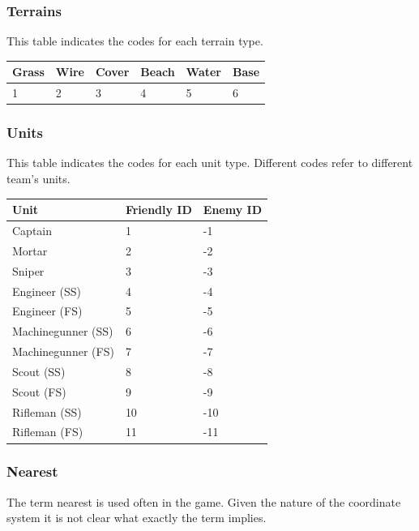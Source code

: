\documentclass{article}
\begin{document}
\subsubsection{Terrains}

This table indicates the codes for each terrain type.

\begin{minipage}{\textwidth}
\centering
\begin{tabular}{llllll}
    Grass & Wire & Cover & Beach & Water & Base \\ \hline
    1 & 2 & 3 & 4 & 5 & 6
\end{tabular}
\end{minipage}

\subsubsection{Units}

This table indicates the codes for each unit type. Different codes refer to
different team's units.

\begin{minipage}{\textwidth}
\centering
\begin{tabular}{lll}
    \hline Unit & Friendly ID & Enemy ID \\ \hline
    Captain & 1 & -1 \\
    Mortar & 2 & -2 \\
    Sniper & 3 & -3 \\
    Engineer (SS) & 4 & -4 \\
    Engineer (FS) & 5 & -5 \\
    Machinegunner (SS) & 6 & -6 \\
    Machinegunner (FS) & 7 & -7 \\
    Scout (SS) & 8 & -8 \\
    Scout (FS) & 9 & -9 \\
    Rifleman (SS) & 10 & -10 \\
    Rifleman (FS) & 11 & -11 \\
\end{tabular}
\end{minipage}

\subsubsection{Nearest}

The term nearest is used often in the game. Given the nature of the coordinate
system it is not clear what exactly the term implies.
\end{document}
